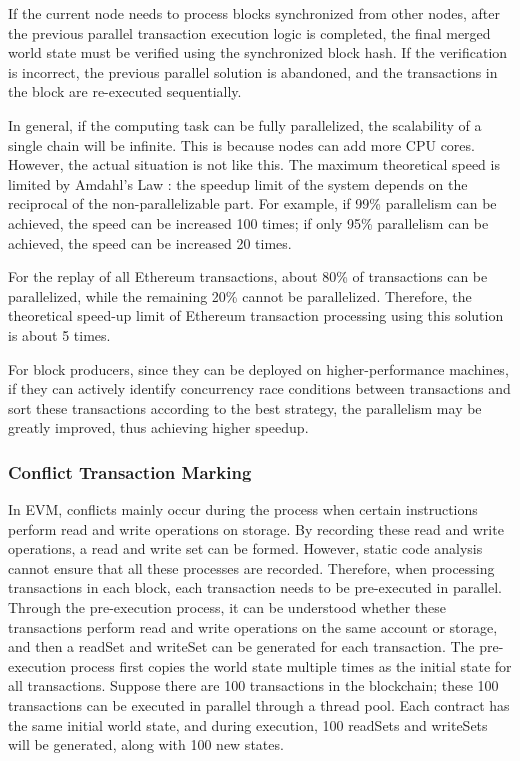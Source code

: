 If the current node needs to process blocks synchronized from other nodes, after the previous parallel transaction execution logic is completed, the final merged world state must be verified using the synchronized block hash. If the verification is incorrect, the previous parallel solution is abandoned, and the transactions in the block are re-executed sequentially.

In general, if the computing task can be fully parallelized, the scalability of a single chain will be infinite. This is because nodes can add more CPU cores. However, the actual situation is not like this. The maximum theoretical speed is limited by Amdahl's Law \cite{website:Amdahls-law}: the speedup limit of the system depends on the reciprocal of the non-parallelizable part. For example, if 99\% parallelism can be achieved, the speed can be increased 100 times; if only 95\% parallelism can be achieved, the speed can be increased 20 times.

For the replay of all Ethereum transactions, about 80\% of transactions can be parallelized, while the remaining 20\% cannot be parallelized. Therefore, the theoretical speed-up limit of Ethereum transaction processing using this solution is about 5 times.

For block producers, since they can be deployed on higher-performance machines, if they can actively identify concurrency race conditions between transactions and sort these transactions according to the best strategy, the parallelism may be greatly improved, thus achieving higher speedup.

\subsubsection{Conflict Transaction Marking}

In EVM, conflicts mainly occur during the process when certain instructions perform read and write operations on storage. By recording these read and write operations, a read and write set can be formed. However, static code analysis cannot ensure that all these processes are recorded. Therefore, when processing transactions in each block, each transaction needs to be pre-executed in parallel. Through the pre-execution process, it can be understood whether these transactions perform read and write operations on the same account or storage, and then a readSet and writeSet can be generated for each transaction. The pre-execution process first copies the world state multiple times as the initial state for all transactions. Suppose there are 100 transactions in the blockchain; these 100 transactions can be executed in parallel through a thread pool. Each contract has the same initial world state, and during execution, 100 readSets and writeSets will be generated, along with 100 new states.

